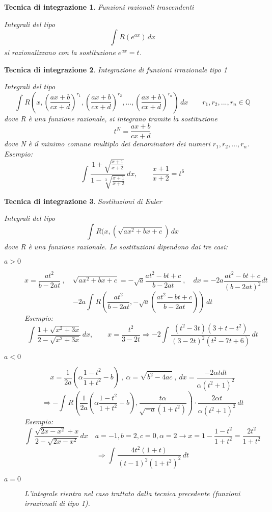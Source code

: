 \documentclass[a4paper, titlepage]{report}%
\theoremstyle{definition} %
\theoremstyle{plain}
\theoremstyle{plain}
\theoremstyle{remark}
\theoremstyle{remark}
\theoremstyle{plain}
\theoremstyle{plain}
\theoremstyle{plain}
\theoremstyle{plain}
\theoremstyle{plain}
\newtheorem*{tecnica}{Tecnica di integrazione}
\begin{document}
\begin{tecnica}{Funzioni razionali trascendenti}

   Integrali del tipo 
\[
    \int_{}^{} R(e^{ax}) \,dx         
\]
si razionalizzano con la sostituzione $e^{ax} = t$.
    
\end{tecnica}
\begin{tecnica}{Integrazione di funzioni irrazionale tipo 1}
    
    Integrali del tipo 
    \[
        \int_{}^{} R(x,(\frac{ax+b}{cx+d})^{r_1},
        (\frac{ax+b}{cx+d})^{r_2},...,
        (\frac{ax+b}{cx+d})^{r_n}) \,dx  
        \qquad r_1,r_2,...,r_n \in \mathbb{Q}      
    \]
dove R è una funzione razionale, si integrano tramite la sostituzione
\[
   t^N = \frac{ax+b}{cx+d}    
\]
dove N è il minimo comune multiplo dei denominatori dei numeri
 $r_1,r_2,...,r_n$. \\
Esempio:
\[
    \int_{}^{} \frac{1+\sqrt{\frac{x+1}{x+2}}}{1- \sqrt[3]{
     \frac{x+1}{x+2}}}\, dx , \qquad \frac{x+1}{x+2} = t^6
\]
\end{tecnica}
\begin{tecnica}{Sostituzioni di Euler}
    
    Integrali del tipo 
    \[
        \int_{}^{} R(x,(\sqrt{ax^2+bx+c}) \, dx      
    \]
dove R è una funzione razionale. Le sostituzioni dipendono dai tre casi:
\begin{description}
    \item[$a>0$] 
    \[
      x = \frac{at^2}{b-2at} \ , \quad \sqrt{ax^2+bx+c} = -\sqrt{a}\frac{at^2-bt+c}
      {b-2at} \ , \quad dx = -2a\frac{at^2-bt+c}{(b-2at)^2}dt
    \] 
    \[
       -2a \int_{}^{} R(\frac{at^2}{b-2at}  ,  -\sqrt{a}(\frac{at^2-bt+c}{b-2at}))
       \, dt    
    \]
    Esempio: 
    \[
    \int_{}^{} \frac{1+\sqrt{x^2+3x}}{2-\sqrt{x^2+3x}} \, dx , \qquad x = \frac{t^2}{3-2t}
    \Longrightarrow -2\int_{}^{} \frac{(t^2-3t)(3+t-t^2)}{(3-2t)^2(t^2-7t+6)} \, dt
    \]

    \item[$a<0$]
    \[
    x = \frac{1}{2a}(\alpha \frac{1-t^2}{1+t^2}-b) \ , \ \alpha = \sqrt{b^2-4ac}  
    \ , \ dx = \frac{-2\alpha t dt}{\alpha(t^2+1)^2}  
    \]
    \[
        \Longrightarrow
       - \int_{}^{} R(\frac{1}{2a}(\alpha \frac{1-t^2}{1+t^2}-b), 
       \frac{t\alpha }{\sqrt{-a}(1+t^2)}) \cdot \frac{2\alpha t}{\alpha(t^2+1)^2}
       \, dt
    \]
    Esempio:
    \[
    \int_{}^{} \frac{\sqrt{2x-x^2}+x}{2-\sqrt{2x-x^2}} \, dx
     \quad a = -1,b = 2, c= 0, \alpha = 2 \longrightarrow x = 1- \frac{1-t^2}
     {1+t^2} = \frac{2t^2}{1+t^2}   
    \]
    \[
      \Longrightarrow \int_{}^{} \frac{4t^2(1+t)}{(t-1)^2(1+t^2)^2}\,dt    
    \]
     
    \item[$a=0$] L'integrale rientra nel caso trattato dalla tecnica precedente
    (funzioni irrazionali di tipo 1).  
\end{description}

\end{tecnica}
\end{document}
